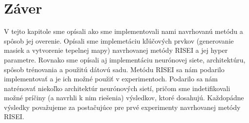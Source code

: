 \section{Záver}

V tejto kapitole sme opísali ako sme implementovali nami navrhovanú metódu a spôsob jej overenie. Opísali sme implemetáciu kľúčových prvkov (generovanie masiek a vytvorenie tepelnej mapy) navrhovanej metódy RISEI a jej hyper parametre. Rovnako sme opísali aj implementáciu neurónovej siete, architektúru, spôsob trénovania a použitú dátovú sadu. Metódu RISEI sa nám podarilo implementovať a je ich možné použiť v experimentoch. Podarilo sa nám natrénovať niekoľko architektúr neurónových sietí, pričom sme indetifikovali možné príčiny (a navrhli k nim riešenia) výsledkov, ktoré dosahujú. Každopádne výsledky považujeme za postačujúce pre prvé experimenty navrhovanej metódy RISEI.
